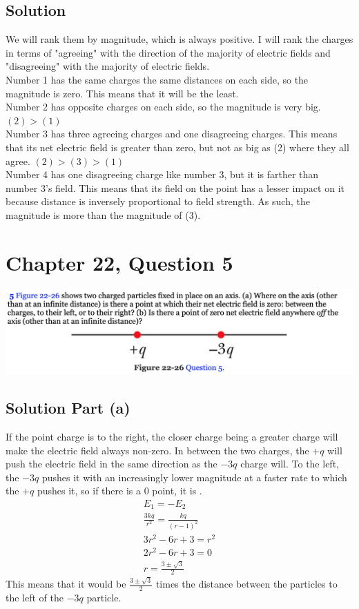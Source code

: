 \documentclass[12pt]{article}
\begin{document}
\subsection*{Solution}
We will rank them by magnitude, which is always positive. I will rank the charges in terms of "agreeing" with the direction of the majority of electric fields and "disagreeing" with the majority of electric fields.\\
Number 1 has the same charges the same distances on each side, so the magnitude is zero. This means that it will be the least.\\
Number 2 has opposite charges on each side, so the magnitude is very big. $(2) > (1)$\\
Number 3 has three agreeing charges and one disagreeing charges. This means that its net electric field is greater than zero, but not as big as (2) where they all agree. $(2) > (3) > (1)$\\
Number 4 has one disagreeing charge like number 3, but it is farther than number 3's field. This means that its field on the point has a lesser impact on it because distance is inversely proportional to field strength. As such, the magnitude is more than the magnitude of (3). 


\pagebreak
\section*{Chapter 22, Question 5}
\includegraphics[width=\textwidth]{picture_4.png}

\subsection*{Solution Part (a)}
If the point charge is to the right, the closer charge being a greater charge will make the electric field always non-zero. In between the two charges, the $+q$ will push the electric field in the same direction as the $-3q$ charge will. To the left, the $-3q$ pushes it with an increasingly lower magnitude at a faster rate to which the $+q$ pushes it, so if there is a 0 point, it is .
\begin{gather*}
    E_1 = -E_2\\
    \frac{3kq}{r^2} = \frac{kq}{(r - 1)^2}\\
    3r^2 - 6r + 3 = r^2\\
    2r^2 - 6r + 3 = 0\\
    r = \frac{3 \pm \sqrt{3}}{2}
\end{gather*}
This means that it would be $\frac{3 \pm \sqrt{3}}{2}$ times the distance between the particles to the left of the $-3q$ particle.
\pagebreak
\end{document}
